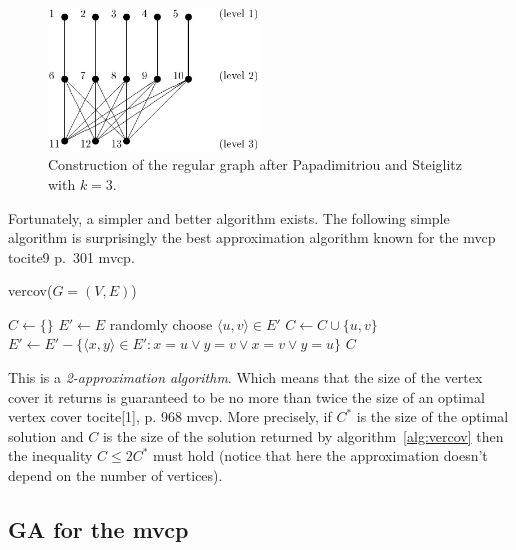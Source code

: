 \documentclass[12pt]{article}
\begin{document}
\begin{figure}[!htbp]
\centering
\includegraphics[width=0.5\textwidth]{ps}
\caption[The regular graph after Papadimitriou
and Steiglitz]{Construction of the regular graph after Papadimitriou
and Steiglitz with $k=3$.}
\label{fig:ps}
\end{figure}

Fortunately, a simpler and better algorithm exists.
The following simple algorithm is surprisingly the
best approximation algorithm known for the mvcp
tocite{9 p.~301 mvcp}.

\begin{algorithm}
\caption{vercov($G = (V, E)$)}
\label{alg:vercov}
\begin{algorithmic}[1]

\State $C \gets \{ \}$
\State $E' \gets E$
\State randomly choose $ \langle u, v \rangle \in E'$
\label{alg:rand}
\State $C \gets C \cup \{u, v\}$
\State $E' \gets E' -
\{ \langle x, y \rangle \in E' : x=u \vee y=v \vee x=v \vee y=u \}$
\State {}
\EndWhile
\State \Return $C$

\end{algorithmic}
\end{algorithm}

This is a \textit{2-approximation algorithm}. Which means that
the size of the vertex cover
it returns is guaranteed to be no more than twice the
size of an optimal vertex cover tocite{[1], p. 968 mvcp}.
More precisely, if $C^*$ is the size of the optimal
solution and $C$ is the size of the solution returned by algorithm~\ref{alg:vercov}
then the inequality $C \leq 2C^*$ must hold (notice that here the approximation
doesn't depend on the number of vertices).

\subsection{GA for the mvcp}
\end{document}
